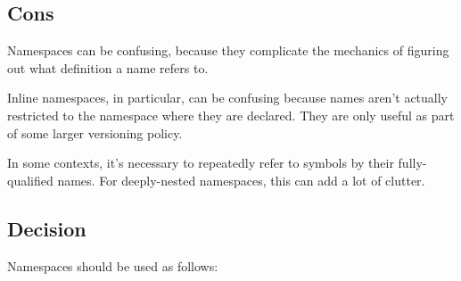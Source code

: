 \subsection{Cons}
Namespaces can be confusing, because they complicate the mechanics of figuring out what definition a name refers to.

Inline namespaces, in particular, can be confusing because names aren't actually restricted to the namespace where they are declared. They are only useful as part of some larger versioning policy.

In some contexts, it's necessary to repeatedly refer to symbols by their fully-qualified names. For deeply-nested namespaces, this can add a lot of clutter.

\subsection{Decision}
Namespaces should be used as follows:
